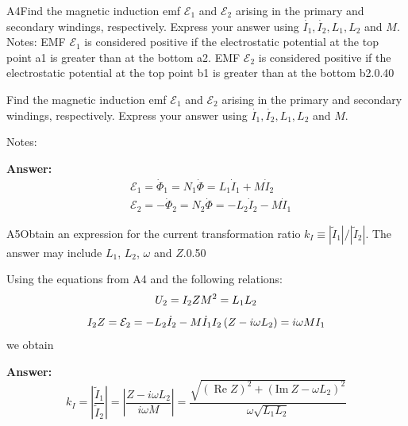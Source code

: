\documentclass[11pt,a4paper]{article}
\begin{document}
\begin{solcard}{A4}{Find the magnetic induction emf $\mathcal E_{1}$ and $\mathcal E_{2}$ arising in the primary and secondary windings, respectively. Express your answer using $\dot{{I}_{1}}, \dot{{I}_{2}}, L_{1}, L_{2}$ and $M$. Notes: EMF $\mathcal E_{1}$ is considered positive if the electrostatic potential at the top point a1 is greater than at the bottom a2. EMF $\mathcal E_{2}$ is considered positive if the electrostatic potential at the top point b1 is greater than at the bottom b2.}{0.40}

Find the magnetic induction emf $\mathcal E_{1}$ and $\mathcal E_{2}$ arising in the primary and secondary windings, respectively. Express your answer using $\dot{{I}_{1}}, \dot{{I}_{2}}, L_{1}, L_{2}$ and $M$.


Notes:

\par\smallskip\noindent\textbf{Answer:} $$ \begin{aligned} & \mathcal E_1=\dot\Phi_1=N_1 \dot{\Phi}=L_1 \dot{I}_1+M \dot{I}_2 \\ & \mathcal E_2=-\dot\Phi_2=N_2 \dot{\Phi}=-L_2 \dot{I}_2-M \dot{I}_1 \end{aligned} $$
\end{solcard}

\begin{solcard}{A5}{Obtain an expression for the current transformation ratio $k_{I}\equiv{\left|\tilde{I}_{1}\right|}/{\left|\tilde{I}_{2}\right|}$. The answer may include $L_1$, $L_2$, $\omega$ and $Z$.}{0.50}

Using the equations from A4 and the following relations: $$U_2 = I_2Z\\ M^2=L_1L_2$$ $$ I_2 Z=\mathcal E_2=-L_2 \dot{I}_2-M \dot{I}_1 \\ I_2\left(Z-i \omega L_2\right)=i \omega M I_1 $$ we obtain

\par\smallskip\noindent\textbf{Answer:} $$ k_I=\left|\frac{\tilde{I}_1}{\tilde{I}_2}\right|=\left|\frac{Z-i \omega L_2}{i \omega M}\right|=\frac{\sqrt{(\operatorname{Re} Z)^2+\left(\text{Im}~ Z-\omega L_2\right)^2}}{\omega \sqrt{L_1 L_2}} $$
\end{solcard}
\end{document}
